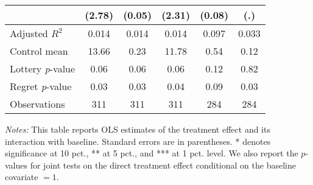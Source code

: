 \begin{table}[ht]
{\begin{threeparttable}
\begin{tabular}{l*{5}{c}}
                &   (2.78)         &   (0.05)         &   (2.31)         &   (0.08)         &      (.)         \\
\midrule
Adjusted \(R^{2}\)&    0.014         &    0.014         &    0.014         &    0.097         &    0.033         \\
Control mean    &    13.66         &     0.23         &    11.78         &     0.54         &     0.12         \\
Lottery \emph{p}-value&     0.06         &     0.06         &     0.06         &     0.12         &     0.82         \\
Regret \emph{p}-value&     0.03         &     0.03         &     0.04         &     0.09         &     0.03         \\
Observations    &      311         &      311         &      311         &      284         &      284         \\
\bottomrule \end{tabular} \begin{tablenotes}[flushleft] \footnotesize \item \emph{Notes:} This table reports OLS estimates of the treatment effect and its interaction with baseline. Standard errors are in parentheses. * denotes significance at 10 pct., ** at 5 pct., and *** at 1 pct. level. We also report the \(p\)-values for joint tests on the direct treatment effect conditional on the baseline covariate $= 1$. \end{tablenotes} \end{threeparttable} } \end{table}

